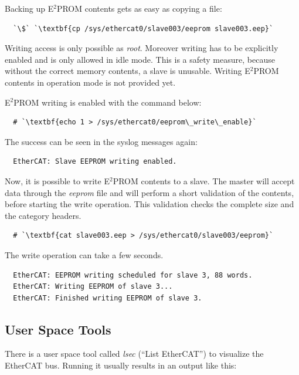 \documentclass[a4paper,12pt,BCOR6mm,bibtotoc,idxtotoc]{scrbook}
\begin{document}
Backing up E$^2$PROM contents gets as easy as copying a file:

\begin{lstlisting}
  `\$` `\textbf{cp /sys/ethercat0/slave003/eeprom slave003.eep}`
\end{lstlisting}

Writing access is only possible as \textit{root}. Moreover writing has
to be explicitly enabled and is only allowed in idle mode. This is a
safety measure, because without the correct memory contents, a slave
is unusable. Writing E$^2$PROM contents in operation mode is not
provided yet.

E$^2$PROM writing is enabled with the command below:

\begin{lstlisting}
  # `\textbf{echo 1 > /sys/ethercat0/eeprom\_write\_enable}`
\end{lstlisting}

The success can be seen in the syslog messages again:

\begin{lstlisting}
  EtherCAT: Slave EEPROM writing enabled.
\end{lstlisting}

Now, it is possible to write E$^2$PROM contents to a slave. The master
will accept data through the \textit{eeprom} file and will perform a
short validation of the contents, before starting the write operation.
This validation checks the complete size and the category headers.

\begin{lstlisting}
  # `\textbf{cat slave003.eep > /sys/ethercat0/slave003/eeprom}`
\end{lstlisting}

The write operation can take a few seconds.

\begin{lstlisting}
  EtherCAT: EEPROM writing scheduled for slave 3, 88 words.
  EtherCAT: Writing EEPROM of slave 3...
  EtherCAT: Finished writing EEPROM of slave 3.
\end{lstlisting}


\subsection{User Space Tools}

There is a user space tool called \textit{lsec} (``List
EtherCAT'') to visualize the EtherCAT bus. Running it usually results
in an output like this:
\end{document}
